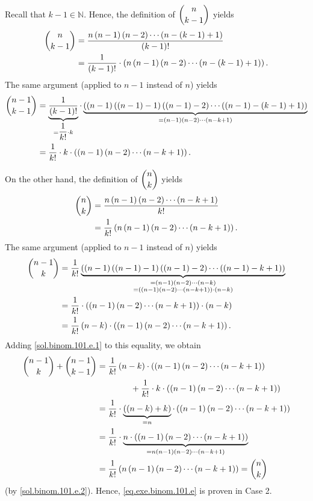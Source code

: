 \documentclass[paper=a4, fontsize=12pt]{scrartcl} %
\newcommand{\NN}{\mathbb{N}} %
\newcommand{\tup}[1]{\left( #1 \right)}
\newcommand{\underbrack}[2]{\underbrace{#1}_{\substack{#2}}}
\theoremstyle{plainsl}
\theoremstyle{definition}
\theoremstyle{remark}
\begin{document}
Recall that $k-1 \in \NN$. Hence, the definition of $\dbinom{n}{k-1}$
yields
\begin{align*}
\dbinom{n}{k-1}
&= \dfrac{n \tup{n-1} \tup{n-2} \cdots \tup{n - \tup{k-1} + 1}}{\tup{k-1}!} \\
&= \dfrac{1}{\tup{k-1}!} \cdot
    \tup{ n \tup{n-1} \tup{n-2} \cdots \tup{n - \tup{k-1} + 1} }.
\end{align*}
The same argument (applied to $n-1$ instead of $n$) yields
\begin{align}
\dbinom{n-1}{k-1}
&= \underbrack{\dfrac{1}{\tup{k-1}!}}{= \dfrac{1}{k!} \cdot k}
   \cdot
   \underbrack{\tup{ \tup{n-1} \tup{\tup{n-1} - 1} \tup{\tup{n-1} - 2}
                     \cdots \tup{\tup{n-1} - \tup{k-1} + 1} }}
              {= \tup{n-1} \tup{n-2} \cdots \tup{n-k+1} } \nonumber\\
&= \dfrac{1}{k!} \cdot k \cdot \tup{ \tup{n-1} \tup{n-2} \cdots \tup{n-k+1} } .
\label{sol.binom.101.e.1}
\end{align}

On the other hand, the definition of $\dbinom{n}{k}$ yields
\begin{align}
\dbinom{n}{k}
&= \dfrac{n \tup{n-1} \tup{n-2} \cdots \tup{n-k+1}}{k!} \nonumber \\
&= \dfrac{1}{k!} \tup{n \tup{n-1} \tup{n-2} \cdots \tup{n-k+1}} .
\label{sol.binom.101.e.2}
\end{align}
The same argument (applied to $n-1$ instead of $n$) yields
\begin{align*}
\dbinom{n-1}{k}
&= \dfrac{1}{k!}
     \underbrack{\tup{ \tup{n-1} \tup{\tup{n-1} - 1}
                       \tup{\tup{n-1} - 2} \cdots
                       \tup{\tup{n-1} - k + 1} }}
                {= \tup{n-1} \tup{n-2} \cdots \tup{n-k} \\
                 = \tup{\tup{n-1} \tup{n-2} \cdots \tup{n-k+1}} \cdot \tup{n-k} } \\
&= \dfrac{1}{k!}
   \cdot \tup{\tup{n-1} \tup{n-2} \cdots \tup{n-k+1}} \cdot \tup{n-k} \\
&= \dfrac{1}{k!} \tup{n-k} \cdot \tup{\tup{n-1} \tup{n-2} \cdots \tup{n-k+1}} .
\end{align*}
Adding \eqref{sol.binom.101.e.1} to this equality, we obtain
\begin{align*}
   \dbinom{n-1}{k} + \dbinom{n-1}{k-1}
&= \dfrac{1}{k!} \tup{n-k} \cdot \tup{\tup{n-1} \tup{n-2} \cdots \tup{n-k+1}} \\
& \qquad \qquad + \dfrac{1}{k!} \cdot k \cdot \tup{ \tup{n-1} \tup{n-2} \cdots \tup{n-k+1} } \\
&= \dfrac{1}{k!} \cdot \underbrack{\tup{\tup{n-k}+k}}{= n}
     \cdot \tup{ \tup{n-1} \tup{n-2} \cdots \tup{n-k+1} } \\
&= \dfrac{1}{k!} \cdot
     \underbrack{n \cdot \tup{ \tup{n-1} \tup{n-2} \cdots \tup{n-k+1} }}
                {= n \tup{n-1} \tup{n-2} \cdots \tup{n-k+1}} \\
&= \dfrac{1}{k!} \tup{ n \tup{n-1} \tup{n-2} \cdots \tup{n-k+1} }
=\dbinom{n}{k}
\end{align*}
(by \eqref{sol.binom.101.e.2}).
Hence, \eqref{eq.exe.binom.101.e} is proven in Case 2.
\end{document}
